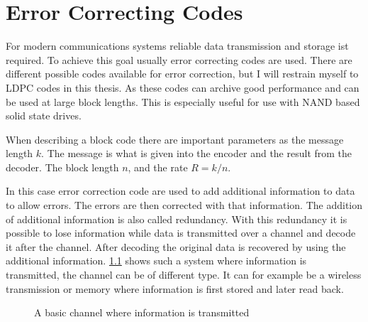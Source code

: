 
\chapter{Error Correcting Codes}

For modern communications systems reliable data transmission and storage ist required. To achieve this goal usually error correcting codes are used. There are different possible codes available for error correction, but I will restrain myself to LDPC\cite{Ga63} codes in this thesis. As these codes can archive good performance and can be used at large block lengths\cite{TaSc2017}. This is especially useful for use with NAND based solid state drives.

When describing a block code there are important parameters as the message length $k$. The message is what is given into the encoder and the result from the decoder. The block length $n$, and the rate $R = k / n$. 

In this case error correction code are used to add additional information to data to allow errors. The errors are then corrected with that information. The addition of additional information is also called redundancy. With this redundancy it is possible to lose information while data is transmitted over a channel and decode it after the channel. After decoding the original data is recovered by using the additional information. \cref{channel_basic} shows such a system where information is transmitted, the channel can be of different type. It can for example be a wireless transmission or memory where information is first stored and later read back. 

\begin{figure}
	\centering
	\caption{A basic channel where information is transmitted}	
	\label{channel_basic}
\end{figure}


